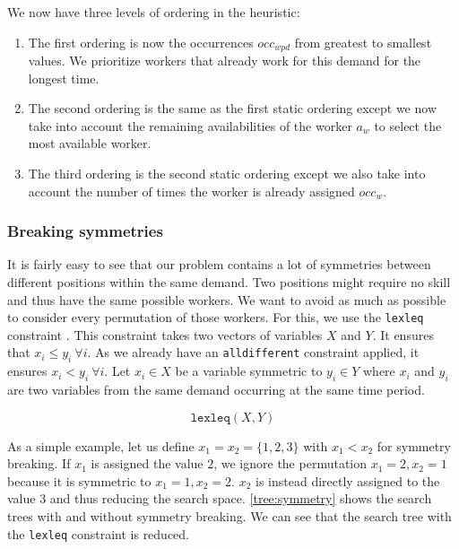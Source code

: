 \documentclass[../../thesis.tex]{subfiles}
\begin{document}
We now have three levels of ordering in the heuristic:

\begin{enumerate}
  \item The first ordering is now the occurrences $occ_{wpd}$ from greatest to smallest values. We prioritize workers that already work for this demand for the longest time.
  \item The second ordering is the same as the first static ordering except we now take into account the 
        remaining availabilities of the worker $a_w$ to select the most available worker.
  \item The third ordering is the second static ordering except we also take into account the number of times the worker 
        is already assigned $occ_w$.
\end{enumerate}


\subsubsection{Breaking symmetries}

It is fairly easy to see that our problem contains a lot of symmetries between different positions within the same demand. 
Two positions might require no skill and thus have the same possible workers. We want to avoid as much as possible to consider every permutation of those workers.
For this, we use the \texttt{lexleq} constraint \cite{Alan:Lex}. This constraint takes two vectors of variables $X$ and $Y$. It ensures that 
$x_i \leq y_i \ \forall i$. As we already have an \texttt{alldifferent} constraint applied, it ensures $x_i < y_i \ \forall i$.
Let $x_i \in X$ be a variable symmetric to $y_i \in Y$ where $x_i$ and $y_i$ are two variables from the same demand occurring at the same time period.


\begin{equation}
  \texttt{lexleq}(X, Y)
\end{equation}

As a simple example, let us define $x_1 = x_2 = \{ 1, 2, 3 \}$ with $x_1 < x_2$ for symmetry breaking. If 
$x_1$ is assigned the value $2$, we ignore the permutation $x_1 = 2, x_2 = 1$ because it is symmetric to $x_1 = 1, x_2 = 2$. $x_2$ is instead directly assigned to the value $3$ and thus reducing the search space.
\autoref{tree:symmetry} shows the search trees with and without symmetry breaking. We can see that the search tree with the \texttt{lexleq} constraint is reduced.
\end{document}
